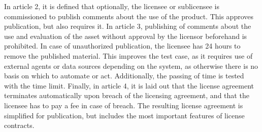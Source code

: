 \documentclass{article}
\begin{document}
In article 2, it is defined that optionally, the licensee or sublicensee is commissioned to publish comments about the use of the product. This %
approves publication, but also requires it. %
In article 3, publishing of comments about the use and evaluation of the asset without approval by the licensor beforehand is prohibited.
In case of unauthorized publication, %
the licensee has 24 hours to remove the published material. This improves %
the test case, as it %
requires use of external agents or data sources depending on the system, as otherwise there is no basis on which to automate or act. Additionally, the passing of time is tested with the time limit.
Finally, in article 4, it is laid out that the license agreement terminates automatically upon breach of the licensing agreement, and that the licensee has to pay a fee in case of breach.
The resulting license agreement is simplified for publication, but includes the most important features of license contracts.
\end{document}

